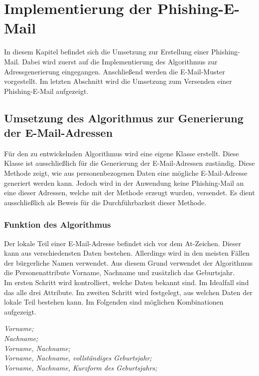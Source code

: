
\chapter{Implementierung der Phishing-E-Mail}  %
\label{cha:ErstellungeinerPhishing-Mail} %
In diesem Kapitel befindet sich die Umsetzung zur Erstellung einer Phishing-Mail. Dabei wird zuerst auf die Implementierung des Algorithmus zur Adressgenerierung eingegangen. Anschließend werden die E-Mail-Muster vorgestellt. Im letzten Abschnitt wird die Umsetzung zum Versenden einer Phishing-E-Mail aufgezeigt. 

\section{Umsetzung des Algorithmus zur Generierung der E-Mail-Adressen}	
Für den zu entwickelnden Algorithmus wird eine eigene Klasse erstellt. Diese Klasse ist ausschließlich für die Generierung der E-Mail-Adressen zuständig. Diese Methode zeigt, wie aus personenbezogenen Daten eine mögliche E-Mail-Adresse generiert werden kann. Jedoch wird in der Anwendung keine Phishing-Mail an eine dieser Adressen, welche mit der Methode erzeugt wurden, versendet. Es dient ausschließlich als Beweis für die Durchführbarkeit dieser Methode.

	\subsection{Funktion des Algorithmus}
	Der lokale Teil einer E-Mail-Adresse befindet sich vor dem At-Zeichen. Dieser kann aus verschiedensten Daten bestehen. Allerdings wird in den meisten Fällen der bürgerliche Namen verwendet. \cite{NameAlsEMail} Aus diesem Grund verwendet der Algorithmus die Personenattribute Vorname, Nachname und zusätzlich das Geburtsjahr.\\
	Im ersten Schritt wird kontrolliert, welche Daten bekannt sind. Im Idealfall sind das alle drei Attribute. Im zweiten Schritt wird festgelegt, aus welchen Daten der lokale Teil bestehen kann. Im Folgenden sind möglichen Kombinationen aufgezeigt.
	
	\textit{Vorname;}\\
	\textit{Nachname;}\\
	\textit{Vorname, Nachname;}\\
	\textit{Vorname, Nachname, vollständiges Geburtsjahr;}\\
	\textit{Vorname, Nachname, Kurzform des Geburtsjahrs;}
	
